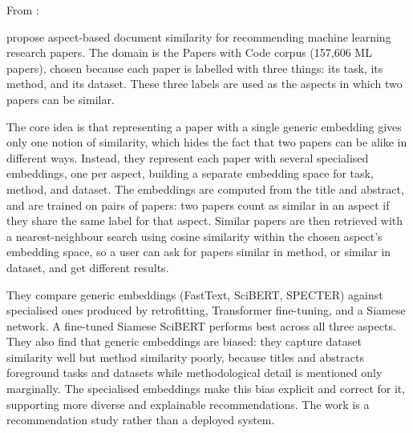 
From \parencite{ostendorff2022_aspect_based_embeddings} :

\textcite{ostendorff2022_aspect_based_embeddings} propose aspect-based document 
similarity for recommending machine learning research papers. 
The domain is the Papers with Code corpus (157,606 ML papers), 
chosen because each paper is labelled with three things: its 
task, its method, and its dataset. These three labels are used 
as the aspects in which two papers can be similar.

The core idea is that representing a paper with a single 
generic embedding gives only one notion of similarity, which 
hides the fact that two papers can be alike in different ways. 
Instead, they represent each paper with several specialised 
embeddings, one per aspect, building a separate embedding space 
for task, method, and dataset. The embeddings are computed from 
the title and abstract, and are trained on pairs of papers: two 
papers count as similar in an aspect if they share the same 
label for that aspect. Similar papers are then retrieved with a 
nearest-neighbour search using cosine similarity within the 
chosen aspect's embedding space, so a user can ask for papers 
similar in method, or similar in dataset, and get different 
results.

They compare generic embeddings (FastText, SciBERT, SPECTER) 
against specialised ones produced by retrofitting, Transformer 
fine-tuning, and a Siamese network. A fine-tuned Siamese SciBERT 
performs best across all three aspects. They also find that 
generic embeddings are biased: they capture dataset similarity 
well but method similarity poorly, because titles and abstracts 
foreground tasks and datasets while methodological detail is 
mentioned only marginally. The specialised embeddings make this 
bias explicit and correct for it, supporting more diverse and 
explainable recommendations. The work is a recommendation study 
rather than a deployed system.